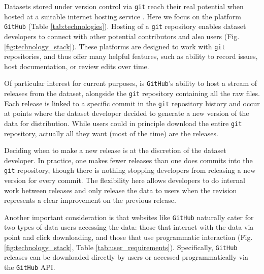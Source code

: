 \documentclass[a4paper,num-refs]{assets/oup-contemporary}
\begin{document}
Datasets stored under version control via \texttt{git} reach their real potential when hosted at a suitable internet hosting service \cite{Ram-2013,Perkel-2016}. Here we focus on the platform \texttt{GitHub} (Table \ref{tab:technologies}). Hosting of a \texttt{git} repository enables dataset developers to connect with other potential contributors and also users (Fig. \ref{fig:technology_stack}). These platforms are designed to work with \texttt{git} repositories, and thus offer many helpful features, such as ability to record issues, host documentation, or review edits over time.

Of particular interest for current purposes, is \texttt{GitHub}'s ability to host a stream of releases from the dataset, alongside the \texttt{git} repository containing all the raw files. Each release is linked to a specific commit in the \texttt{git} repository history and occur at points where the dataset developer decided to generate a new version of the data for distribution. While users could in principle download the entire \texttt{git} repository, actually all they want (most of the time) are the releases.

Deciding when to make a new release is at the discretion of the dataset developer. In practice, one makes fewer releases than one does commits into the \texttt{git} repository, though there is nothing stopping developers from releasing a new version for every commit. The flexibility here allows developers to do internal work between releases and only release the data to users when the revision represents a clear improvement on the previous release.

Another important consideration is that websites like \texttt{GitHub} naturally cater for two types of data users accessing the data: those that interact with the data via point and click downloading, and those that use programmatic interaction (Fig. \ref{fig:technology_stack}, Table \ref{tab:user_requirements}). Specifically, \texttt{GitHub} releases can be downloaded directly by users or accessed programmatically via the \texttt{GitHub} API.
\end{document}
